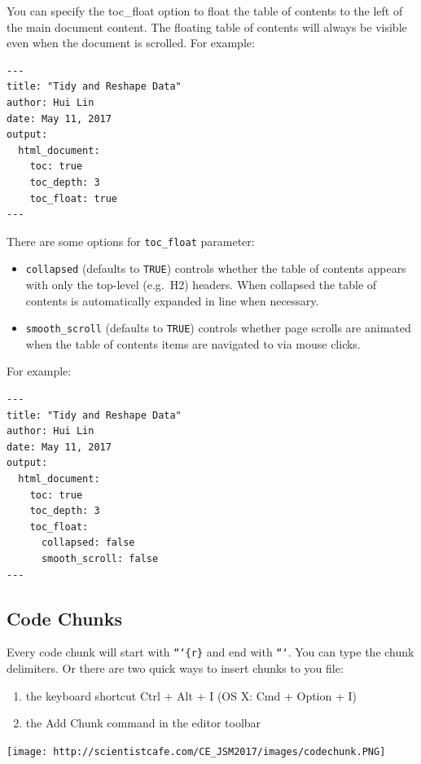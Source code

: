 \documentclass[]{book}
\providecommand{\tightlist}{%
  \setlength{\itemsep}{0pt}\setlength{\parskip}{0pt}}
\theoremstyle{definition}
\theoremstyle{definition}
\theoremstyle{remark}
\begin{document}
You can specify the toc\_float option to float the table of contents to
the left of the main document content. The floating table of contents
will always be visible even when the document is scrolled. For example:

\begin{verbatim}
---
title: "Tidy and Reshape Data"
author: Hui Lin
date: May 11, 2017
output:
  html_document:
    toc: true
    toc_depth: 3
    toc_float: true
---
\end{verbatim}

There are some options for \texttt{toc\_float} parameter:

\begin{itemize}
\item
  \texttt{collapsed} (defaults to \texttt{TRUE}) controls whether the
  table of contents appears with only the top-level (e.g.~H2) headers.
  When collapsed the table of contents is automatically expanded in line
  when necessary.
\item
  \texttt{smooth\_scroll} (defaults to \texttt{TRUE}) controls whether
  page scrolls are animated when the table of contents items are
  navigated to via mouse clicks.
\end{itemize}

For example:

\begin{verbatim}
---
title: "Tidy and Reshape Data"
author: Hui Lin
date: May 11, 2017
output:
  html_document:
    toc: true
    toc_depth: 3
    toc_float:
      collapsed: false
      smooth_scroll: false
---
\end{verbatim}

\subsection{Code Chunks}\label{code-chunks}

Every code chunk will start with \texttt{```\{r\}} and end with
\texttt{```}. You can type the chunk delimiters. Or there are two quick
ways to insert chunks to you file:

\begin{enumerate}
\def\labelenumi{(\arabic{enumi})}
\tightlist
\item
  the keyboard shortcut Ctrl + Alt + I (OS X: Cmd + Option + I)
\item
  the Add Chunk command in the editor toolbar
\end{enumerate}

\texttt{[image: http://scientistcafe.com/CE\_JSM2017/images/codechunk.PNG]}
\end{document}
